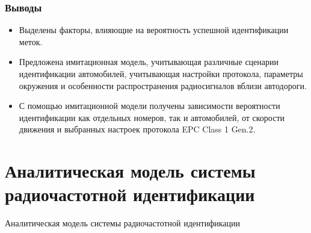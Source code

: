 \begin{frame}
    \frametitle{Выводы}
    \begin{itemize}
        \item Выделены факторы, влияющие на вероятность успешной идентификации меток.
        \item Предложена имитационная модель, учитывающая различные сценарии идентификации автомобилей, учитывающая настройки протокола, параметры окружения и особенности распространения радиосигналов вблизи автодороги.
        \item С помощью имитационной модели получены зависимости вероятности идентификации как отдельных номеров, так и автомобилей, от скорости движения и выбранных настроек протокола EPC Class 1 Gen.2.
    \end{itemize}
\end{frame}



\section{Аналитическая модель системы радиочастотной идентификации}
\begin{frame}
    \begin{center}
        \Huge
        Аналитическая модель системы радиочастотной идентификации
    \end{center}
\end{frame}

